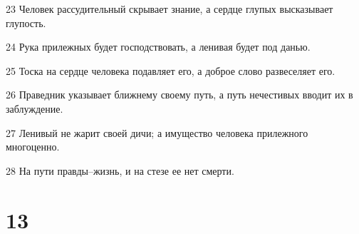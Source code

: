 \par 23 Человек рассудительный скрывает знание, а сердце глупых высказывает глупость.
\par 24 Рука прилежных будет господствовать, а ленивая будет под данью.
\par 25 Тоска на сердце человека подавляет его, а доброе слово развеселяет его.
\par 26 Праведник указывает ближнему своему путь, а путь нечестивых вводит их в заблуждение.
\par 27 Ленивый не жарит своей дичи; а имущество человека прилежного многоценно.
\par 28 На пути правды--жизнь, и на стезе ее нет смерти.

\chapter{13}

